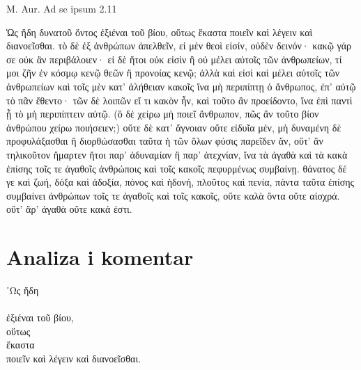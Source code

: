 M. Aur. Ad se ipsum 2.11


\medskip


{\large
{ 
\begin{greek}

\noindent  Ὡς ἤδη δυνατοῦ ὄντος ἐξιέναι τοῦ βίου, οὕτως ἕκαστα ποιεῖν καὶ λέγειν καὶ διανοεῖσθαι. τὸ δὲ ἐξ ἀνθρώπων ἀπελθεῖν, εἰ μὲν θεοὶ εἰσίν, οὐδὲν δεινόν· κακῷ γάρ σε οὐκ ἂν περιβάλοιεν· εἰ δὲ ἤτοι οὐκ εἰσὶν ἢ οὐ μέλει αὐτοῖς τῶν ἀνθρωπείων, τί μοι ζῆν ἐν κόσμῳ κενῷ θεῶν ἢ προνοίας κενῷ; ἀλλὰ καὶ εἰσὶ καὶ μέλει αὐτοῖς τῶν ἀνθρωπείων καὶ τοῖς μὲν κατ' ἀλήθειαν κακοῖς ἵνα μὴ περιπίπτῃ ὁ ἄνθρωπος, ἐπ' αὐτῷ τὸ πᾶν ἔθεντο· τῶν δὲ λοιπῶν εἴ τι κακὸν ἦν, καὶ τοῦτο ἂν προείδοντο, ἵνα ἐπὶ παντὶ ᾖ τὸ μὴ περιπίπτειν αὐτῷ. (ὃ δὲ χείρω μὴ ποιεῖ ἄνθρωπον, πῶς ἂν τοῦτο βίον ἀνθρώπου χείρω ποιήσειεν;) οὔτε δὲ κατ' ἄγνοιαν οὔτε εἰδυῖα μέν, μὴ δυναμένη δὲ προφυλάξασθαι ἢ διορθώσασθαι ταῦτα ἡ τῶν ὅλων φύσις παρεῖδεν ἄν, οὔτ' ἂν τηλικοῦτον ἥμαρτεν ἤτοι παρ' ἀδυναμίαν ἢ παρ' ἀτεχνίαν, ἵνα τὰ ἀγαθὰ καὶ τὰ κακὰ ἐπίσης τοῖς τε ἀγαθοῖς ἀνθρώποις καὶ τοῖς κακοῖς πεφυρμένως συμβαίνῃ. θάνατος δέ γε καὶ ζωή, δόξα καὶ ἀδοξία, πόνος καὶ ἡδονή, πλοῦτος καὶ πενία, πάντα ταῦτα ἐπίσης συμβαίνει ἀνθρώπων τοῖς τε ἀγαθοῖς καὶ τοῖς κακοῖς, οὔτε καλὰ ὄντα οὔτε αἰσχρά. οὔτ' ἄρ' ἀγαθὰ οὔτε κακά ἐστι.


\end{greek}


}
}


\section*{Analiza i komentar}


{\large
\begin{greek}
\noindent ῾Ως ἤδη \\
\tabto{2em}  \\
\tabto{4em} ἐξιέναι τοῦ βίου, \\
οὕτως \\
\tabto{2em} ἕκαστα \\
\tabto{4em} ποιεῖν καὶ λέγειν καὶ διανοεῖσθαι.\\

\end{greek}
}


